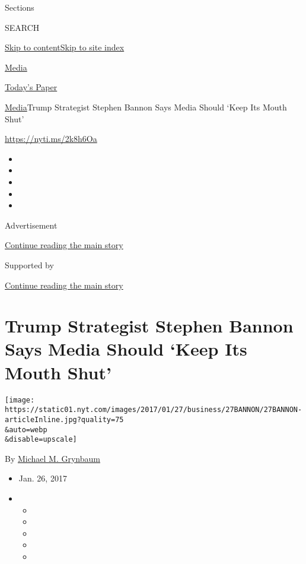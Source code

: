 Sections

SEARCH

\protect\hyperlink{site-content}{Skip to
content}\protect\hyperlink{site-index}{Skip to site index}

\href{https://www.nytimes.com/pages/business/media/index.html}{Media}

\href{https://myaccount.nytimes.com/auth/login?response_type=cookie\&client_id=vi}{}

\href{https://www.nytimes.com/section/todayspaper}{Today's Paper}

\href{/pages/business/media/index.html}{Media}\textbar{}Trump Strategist
Stephen Bannon Says Media Should `Keep Its Mouth Shut'

\url{https://nyti.ms/2k8h6Oa}

\begin{itemize}
\item
\item
\item
\item
\item
\end{itemize}

Advertisement

\protect\hyperlink{after-top}{Continue reading the main story}

Supported by

\protect\hyperlink{after-sponsor}{Continue reading the main story}

\hypertarget{trump-strategist-stephen-bannon-says-media-should-keep-its-mouth-shut}{%
\section{Trump Strategist Stephen Bannon Says Media Should `Keep Its
Mouth
Shut'}\label{trump-strategist-stephen-bannon-says-media-should-keep-its-mouth-shut}}

\texttt{[image: https://static01.nyt.com/images/2017/01/27/business/27BANNON/27BANNON-articleInline.jpg?quality=75\\\&auto=webp\\\&disable=upscale]}

By \href{http://www.nytimes.com/by/michael-m-grynbaum}{Michael M.
Grynbaum}

\begin{itemize}
\item
  Jan. 26, 2017
\item
  \begin{itemize}
  \item
  \item
  \item
  \item
  \item
  \end{itemize}
\end{itemize}

